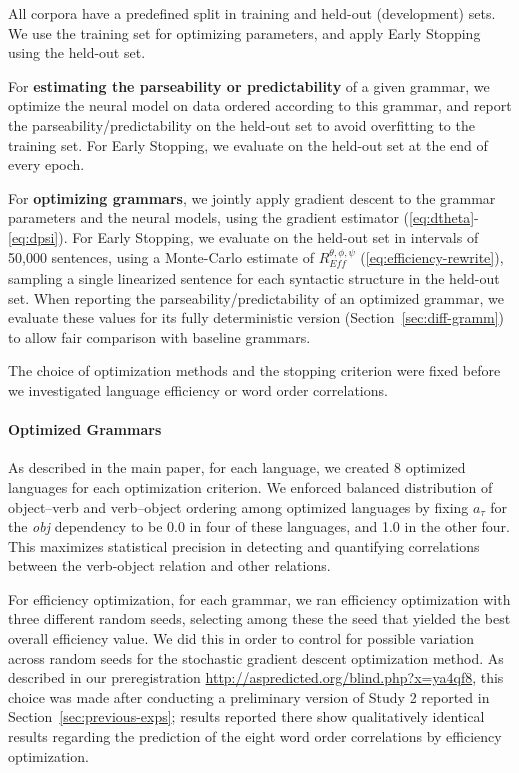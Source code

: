 \documentclass[10pt,twoside,lineno]{article}
\newcommand{\key}[1]{\textbf{#1}}
\begin{document}
All corpora have a predefined split in training and held-out (development) sets.
We use the training set for optimizing parameters, and apply Early Stopping~\citep{prechelt1998early} using the held-out set.

For \key{estimating the parseability or predictability} of a given grammar, we optimize the neural model on data ordered according to this grammar, and report the parseability/predictability on the held-out set to avoid overfitting to the training set.
For Early Stopping, we evaluate on the held-out set at the end of every epoch. %

For \key{optimizing grammars}, we jointly apply gradient descent to the grammar parameters and the neural models, using the gradient estimator (\ref{eq:dtheta}-\ref{eq:dpsi}).
For Early Stopping, we evaluate on the held-out set in intervals of 50,000 sentences, using a Monte-Carlo estimate of $R_{\textit{Eff}}^{\theta, \phi, \psi}$ (\ref{eq:efficiency-rewrite}), sampling a single linearized sentence for each syntactic structure in the held-out set.
When reporting the parseability/predictability of an optimized grammar, we evaluate these values for its fully deterministic version (Section~\ref{sec:diff-gramm}) to allow fair comparison with baseline grammars.


The choice of optimization methods and the stopping criterion were fixed before we investigated language efficiency or word order correlations.

\paragraph{Optimized Grammars}
As described in the main paper, for each language, we created 8 optimized languages for each optimization criterion.
We enforced balanced distribution of object--verb and verb--object ordering among optimized languages by fixing $a_\tau$ for the \textit{obj} dependency to be 0.0 in four of these languages, and 1.0 in the other four.
This maximizes statistical precision in detecting and quantifying correlations between the verb-object relation and other relations.

For efficiency optimization, for each grammar, we ran efficiency optimization with three different random seeds, selecting among these the seed that yielded the best overall efficiency value.
We did this in order to control for possible variation across random seeds for the stochastic gradient descent optimization method.
As described in our preregistration \url{http://aspredicted.org/blind.php?x=ya4qf8}, this choice was made after conducting a preliminary version of Study 2 reported in Section~\ref{sec:previous-exps}; results reported there show qualitatively identical results regarding the prediction of the eight word order correlations by efficiency optimization.
\end{document}
